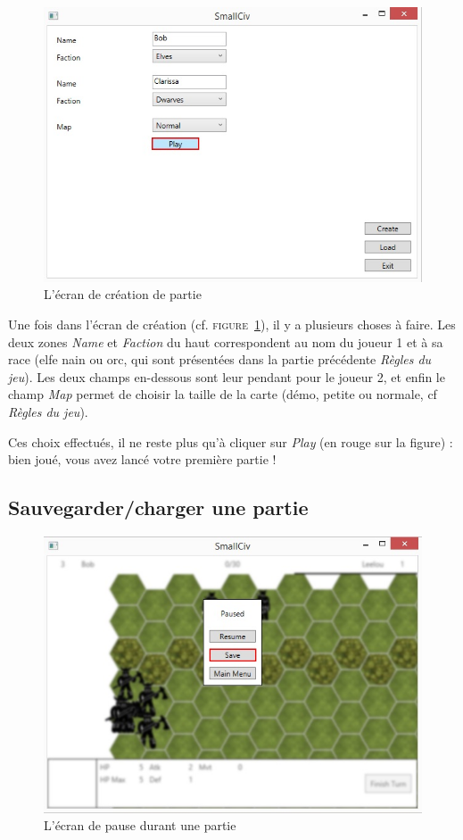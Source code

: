 \begin{figure}
	\centering
	\includegraphics{img/creation.jpg}
	\caption{L'écran de création de partie}
	\label{creation}
\end{figure}
Une fois dans l'écran de création (cf. \textsc{figure~\ref{creation}}), il y a plusieurs choses à faire. Les deux zones \emph{Name} et \emph{Faction} du haut correspondent au nom du joueur 1 et à sa race (elfe nain ou orc, qui sont présentées dans la partie précédente \emph{Règles du jeu}). Les deux champs en-dessous sont leur pendant pour le joueur 2, et enfin le champ \emph{Map} permet de choisir la taille de la carte (démo, petite ou normale, cf \emph{Règles du jeu}).\newline

Ces choix effectués, il ne reste plus qu'à cliquer sur \emph{Play} (en rouge sur la figure) : bien joué, vous avez lancé votre première partie ! 

\subsection{Sauvegarder/charger une partie}
\begin{figure}
	\centering
	\includegraphics{img/pause_to_save.jpg}
	\caption{L'écran de pause durant une partie}
	\label{pause}
\end{figure}

